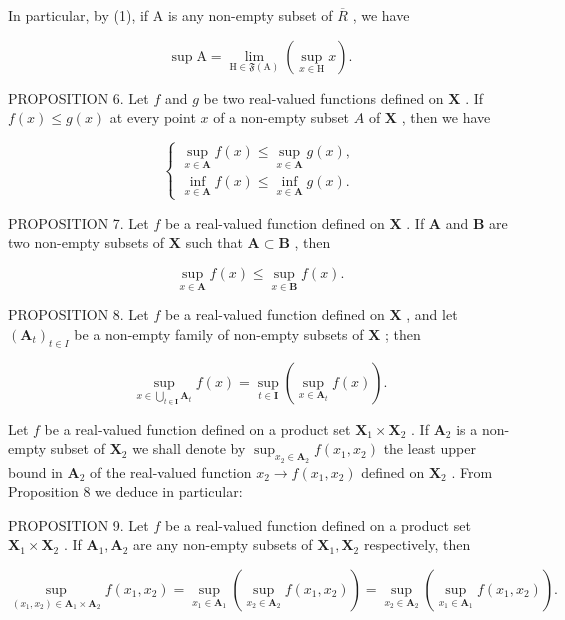In particular, by (1), if A is any non-empty subset of \(\overline{R}\) , we have

\[
\sup \mathrm{A} = \lim _ {\mathrm{H} \in \mathfrak {F} (\mathrm{A})} (\sup _ {x \in \mathrm{H}} x).\tag{4}
\]

PROPOSITION 6. Let \(f\) and \(g\) be two real-valued functions defined on \(\mathbf{X}\) . If \(f(x) \leqslant g(x)\) at every point \(x\) of a non-empty subset \(A\) of \(\mathbf{X}\) , then we have

\[
\left\{ \begin{array}{l} \sup _ {x \in \mathbf {A}} f (x) \leqslant \sup _ {x \in \mathbf {A}} g (x), \\ \inf _ {x \in \mathbf {A}} f (x) \leqslant \inf _ {x \in \mathbf {A}} g (x). \end{array} \right.\tag{5}
\]

PROPOSITION 7. Let \(f\) be a real-valued function defined on \(\mathbf{X}\) . If \(\mathbf{A}\) and \(\mathbf{B}\) are two non-empty subsets of \(\mathbf{X}\) such that \(\mathbf{A} \subset \mathbf{B}\) , then

\[
\sup _ {x \in \mathbf {A}} f (x) \leqslant \sup _ {x \in \mathbf {B}} f (x).\tag{6}
\]

PROPOSITION 8. Let \(f\) be a real-valued function defined on \(\mathbf{X}\) , and let \((\mathbf{A}_t)_{t \in I}\) be a non-empty family of non-empty subsets of \(\mathbf{X}\) ; then

\[
\sup_{x\in \bigcup_{t\in \mathbf{I}}\mathbf{A}_{t}}f(x) = \sup_{t\in \mathbf{I}}(\sup_{x\in \mathbf{A}_{t}}f(x)).\tag{7}
\]

Let \(f\) be a real-valued function defined on a product set \(\mathbf{X}_1 \times \mathbf{X}_2\) . If \(\mathbf{A}_2\) is a non-empty subset of \(\mathbf{X}_2\) we shall denote by \(\sup_{x_2 \in \mathbf{A}_2} f(x_1, x_2)\) the least upper bound in \(\mathbf{A}_2\) of the real-valued function \(x_2 \to f(x_1, x_2)\) defined on \(\mathbf{X}_2\) . From Proposition 8 we deduce in particular:

PROPOSITION 9. Let \(f\) be a real-valued function defined on a product set \(\mathbf{X}_1 \times \mathbf{X}_2\) . If \(\mathbf{A}_1, \mathbf{A}_2\) are any non-empty subsets of \(\mathbf{X}_1, \mathbf{X}_2\) respectively, then

\[
\sup _ {(x _ {1}, x _ {2}) \in \mathbf {A} _ {1} \times \mathbf {A} _ {2}} f (x _ {1}, x _ {2}) = \sup _ {x _ {1} \in \mathbf {A} _ {1}} (\sup _ {x _ {2} \in \mathbf {A} _ {2}} f (x _ {1}, x _ {2})) = \sup _ {x _ {2} \in \mathbf {A} _ {2}} (\sup _ {x _ {1} \in \mathbf {A} _ {1}} f (x _ {1}, x _ {2})).\tag{8}
\]

